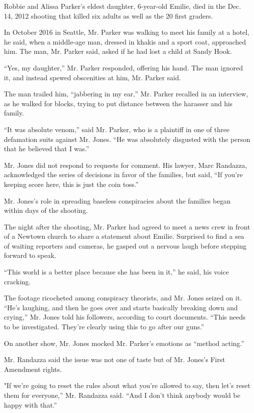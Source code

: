 Robbie and Alissa Parker's eldest daughter, 6-year-old Emilie, died in
the Dec. 14, 2012 shooting that killed six adults as well as the 20
first graders.

In October 2016 in Seattle, Mr. Parker was walking to meet his family at
a hotel, he said, when a middle-age man, dressed in khakis and a sport
coat, approached him. The man, Mr. Parker said, asked if he had lost a
child at Sandy Hook.

``Yes, my daughter,'' Mr. Parker responded, offering his hand. The man
ignored it, and instead spewed obscenities at him, Mr. Parker said.

The man trailed him, ``jabbering in my ear,'' Mr. Parker recalled in an
interview, as he walked for blocks, trying to put distance between the
harasser and his family.

``It was absolute venom,'' said Mr. Parker, who is a plaintiff in one of
three defamation suits against Mr. Jones. ``He was absolutely disgusted
with the person that he believed that I was.''

Mr. Jones did not respond to requests for comment. His lawyer, Marc
Randazza, acknowledged the series of decisions in favor of the families,
but said, ``If you're keeping score here, this is just the coin toss.''

Mr. Jones's role in spreading baseless conspiracies about the families
began within days of the shooting.

The night after the shooting, Mr. Parker had agreed to meet a news crew
in front of a Newtown church to share a statement about Emilie.
Surprised to find a sea of waiting reporters and cameras, he gasped out
a nervous laugh before stepping forward to speak.

``This world is a better place because she has been in it,'' he said,
his voice cracking.

The footage ricocheted among conspiracy theorists, and Mr. Jones seized
on it. ``He's laughing, and then he goes over and starts basically
breaking down and crying,'' Mr. Jones told his followers, according to
court documents. ``This needs to be investigated. They're clearly using
this to go after our guns.''

On another show, Mr. Jones mocked Mr. Parker's emotions as ``method
acting.''

Mr. Randazza said the issue was not one of taste but of Mr. Jones's
First Amendment rights.

"If we're going to reset the rules about what you're allowed to say,
then let's reset them for everyone,'' Mr. Randazza said. ``And I don't
think anybody would be happy with that.''

